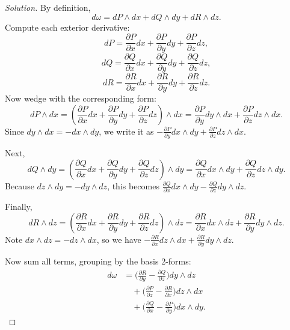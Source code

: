 \documentclass[12pt, a4paper]{article}
\theoremstyle{definition}
\newenvironment{solution}
  {\renewcommand\qedsymbol{$\blacksquare$}\begin{proof}[Solution]}
  {\end{proof}}
\begin{document}
\begin{solution}
By definition,
\[
d\omega = dP \wedge dx + dQ \wedge dy + dR \wedge dz.
\]
Compute each exterior derivative:
\[
dP = \frac{\partial P}{\partial x}dx + \frac{\partial P}{\partial y}dy + \frac{\partial P}{\partial z}dz,
\]
\[
dQ = \frac{\partial Q}{\partial x}dx + \frac{\partial Q}{\partial y}dy + \frac{\partial Q}{\partial z}dz,
\]
\[
dR = \frac{\partial R}{\partial x}dx + \frac{\partial R}{\partial y}dy + \frac{\partial R}{\partial z}dz.
\]
Now wedge with the corresponding form:
\[
dP \wedge dx = \left( \frac{\partial P}{\partial x}dx + \frac{\partial P}{\partial y}dy + \frac{\partial P}{\partial z}dz \right) \wedge dx
= \frac{\partial P}{\partial y} dy\wedge dx + \frac{\partial P}{\partial z} dz\wedge dx.
\]
Since \(dy\wedge dx = -dx\wedge dy\), we write it as \( -\frac{\partial P}{\partial y} dx\wedge dy + \frac{\partial P}{\partial z} dz\wedge dx\).

Next,
\[
dQ \wedge dy = \left( \frac{\partial Q}{\partial x}dx + \frac{\partial Q}{\partial y}dy + \frac{\partial Q}{\partial z}dz \right) \wedge dy
= \frac{\partial Q}{\partial x} dx\wedge dy + \frac{\partial Q}{\partial z} dz\wedge dy.
\]
Because \(dz\wedge dy = -dy\wedge dz\), this becomes \( \frac{\partial Q}{\partial x} dx\wedge dy - \frac{\partial Q}{\partial z} dy\wedge dz\).

Finally,
\[
dR \wedge dz = \left( \frac{\partial R}{\partial x}dx + \frac{\partial R}{\partial y}dy + \frac{\partial R}{\partial z}dz \right) \wedge dz
= \frac{\partial R}{\partial x} dx\wedge dz + \frac{\partial R}{\partial y} dy\wedge dz.
\]
Note \(dx\wedge dz = -dz\wedge dx\), so we have \( -\frac{\partial R}{\partial x} dz\wedge dx + \frac{\partial R}{\partial y} dy\wedge dz\).

Now sum all terms, grouping by the basis 2-forms:
\begin{align*}
d\omega &= \bigl( \frac{\partial R}{\partial y} - \frac{\partial Q}{\partial z} \bigr) dy\wedge dz \\
        &\quad + \bigl( \frac{\partial P}{\partial z} - \frac{\partial R}{\partial x} \bigr) dz\wedge dx \\
        &\quad + \bigl( \frac{\partial Q}{\partial x} - \frac{\partial P}{\partial y} \bigr) dx\wedge dy.
\end{align*}
\end{solution}

\vfill
\end{document}
